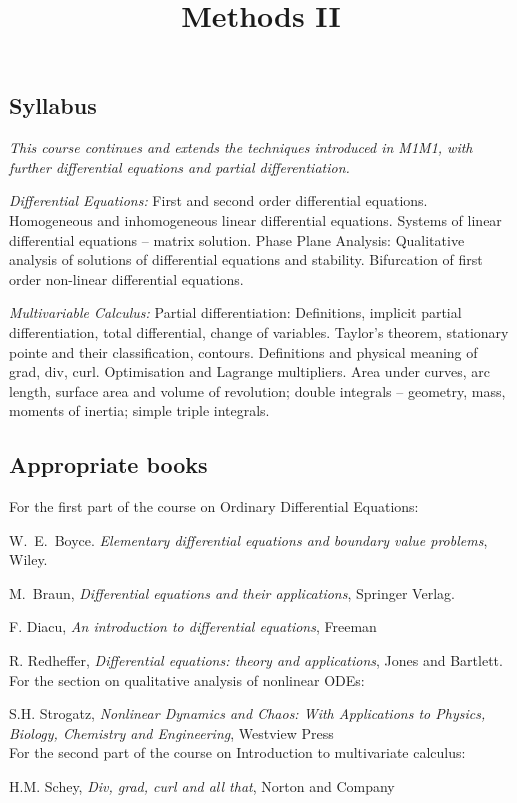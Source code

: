 \documentclass[10pt]{scrartcl}
\title{Methods II}
\begin{document}
{
\subsection*{Syllabus}

\textit{This course continues and extends the techniques introduced in M1M1, with further differential equations and partial differentiation.}


\emph{Differential Equations:} First and second order differential equations. Homogeneous and inhomogeneous linear differential equations. Systems of linear differential equations – matrix solution. Phase Plane Analysis: Qualitative analysis of solutions of differential equations and stability. Bifurcation of first order non-linear differential equations.

\emph{Multivariable Calculus:}
 Partial differentiation: Definitions, implicit partial differentiation, total differential, change of variables. Taylor’s theorem, stationary pointe and their classification, contours. Definitions and physical meaning of grad, div, curl.  Optimisation and Lagrange multipliers. Area under curves, arc length, surface area and volume of revolution; double integrals – geometry, mass, moments of inertia; simple triple integrals.\\

\subsection*{Appropriate books}

For the first part of the course on Ordinary Differential Equations:

{\shortskip 
W.~E.~Boyce. \emph{Elementary differential equations and boundary value problems}, Wiley.

M.~Braun, \emph{Differential equations and their applications}, Springer Verlag.

F. Diacu, \emph{An introduction to differential equations}, Freeman

R. Redheffer, \emph{Differential equations: theory and applications}, Jones and Bartlett.\\


For the section on qualitative analysis of nonlinear ODEs:

S.H. Strogatz, \emph{Nonlinear Dynamics and Chaos: With Applications to Physics, Biology, Chemistry and Engineering}, Westview Press\\


For the second part of the course on Introduction to multivariate calculus:

H.M. Schey, \emph{Div, grad, curl and all that}, Norton and Company
}}
\end{document}
